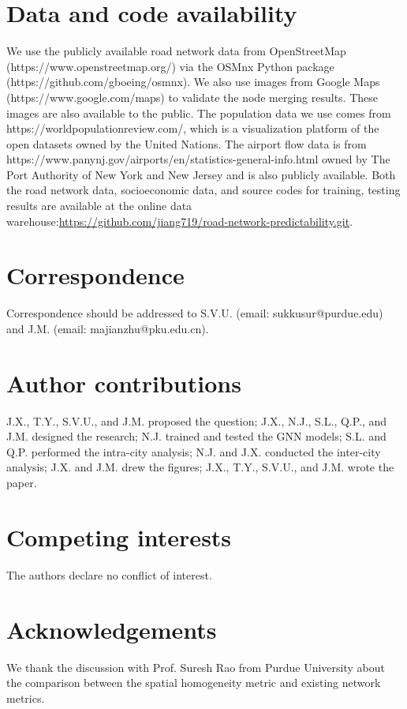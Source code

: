 \documentclass[10pt]{wlscirep}
\begin{document}
\section*{Data and code availability}
We use the publicly available road network data from OpenStreetMap (https://www.openstreetmap.org/) via the OSMnx Python package  (https://github.com/gboeing/osmnx). We also use images from Google Maps (https://www.google.com/maps) to validate the node merging results. These images are also available to the public. The population data we use comes from https://worldpopulationreview.com/, which is a visualization platform of the open datasets owned by the United Nations. The airport flow data is from https://www.panynj.gov/airports/en/statistics-general-info.html owned by The Port Authority of New York and New Jersey and is also publicly available. Both the road network data, socioeconomic data, and source codes for training, testing results are available at the online data warehouse:\;\;\;\href{https://github.com/jiang719/road-network-predictability.git}{https://github.com/jiang719/road-network-predictability.git}. 

\section*{Correspondence} 
Correspondence should be addressed to S.V.U. (email: sukkusur@purdue.edu) and J.M. (email: 
majianzhu@pku.edu.cn).
\section*{Author contributions} J.X., T.Y., S.V.U., and J.M. proposed the question; J.X., N.J., S.L., Q.P., and J.M. designed the research; N.J. trained and tested the GNN models; S.L. and Q.P. performed the intra-city analysis; N.J. and J.X. conducted the inter-city analysis; J.X. and J.M. drew the figures; J.X., T.Y., S.V.U., and J.M. wrote the paper.

\section*{Competing interests} The authors declare no conflict of interest.

\section*{Acknowledgements} We thank the discussion with Prof. Suresh Rao from Purdue University about the comparison between the spatial homogeneity metric and existing network metrics.


\end{document}
